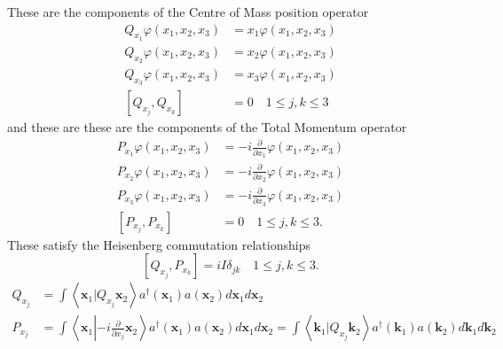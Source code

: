 \documentclass[aps,preprint]{revtex4}%
\begin{document}
These are the components of the Centre of Mass position operator%
\begin{align}
Q_{x_{1}}\varphi\left(  x_{1},x_{2},x_{3}\right)   &  =x_{1}\varphi\left(
x_{1},x_{2},x_{3}\right) \\
Q_{x_{2}}\varphi\left(  x_{1},x_{2},x_{3}\right)   &  =x_{2}\varphi\left(
x_{1},x_{2},x_{3}\right) \\
Q_{x_{3}}\varphi\left(  x_{1},x_{2},x_{3}\right)   &  =x_{3}\varphi\left(
x_{1},x_{2},x_{3}\right) \\
\left[  Q_{x_{j}},Q_{x_{k}}\right]   &  =0\quad1\leq j,k\leq3
\end{align}
and these are these are the components of the Total Momentum operator%
\begin{align}
P_{x_{1}}\varphi\left(  x_{1},x_{2},x_{3}\right)   &  =-i\frac{\partial
}{\partial x_{1}}\varphi\left(  x_{1},x_{2},x_{3}\right) \\
P_{x_{2}}\varphi\left(  x_{1},x_{2},x_{3}\right)   &  =-i\frac{\partial
}{\partial x_{2}}\varphi\left(  x_{1},x_{2},x_{3}\right) \\
P_{x_{3}}\varphi\left(  x_{1},x_{2},x_{3}\right)   &  =-i\frac{\partial
}{\partial x_{3}}\varphi\left(  x_{1},x_{2},x_{3}\right) \\
\left[  P_{x_{j}},P_{x_{k}}\right]   &  =0\quad1\leq j,k\leq3.
\end{align}
These satisfy the Heisenberg commutation relationships
\begin{equation}
\left[  Q_{x_{j}},P_{x_{k}}\right]  =iI\delta_{jk}\quad1\leq j,k\leq3.
\end{equation}%
\begin{align}
Q_{x_{j}}  &  =\int\left\langle \left.  \mathbf{x}_{1}\right\vert Q_{x_{j}%
}\mathbf{x}_{2}\right\rangle a^{\dagger}\left(  \mathbf{x}_{1}\right)
a\left(  \mathbf{x}_{2}\right)  d\mathbf{x}_{1}d\mathbf{x}_{2}\\
P_{x_{j}}  &  =\int\left\langle \mathbf{x}_{1}\left\vert -i\frac{\partial
}{\partial x_{j}}\mathbf{x}_{2}\right.  \right\rangle a^{\dagger}\left(
\mathbf{x}_{1}\right)  a\left(  \mathbf{x}_{2}\right)  d\mathbf{x}%
_{1}d\mathbf{x}_{2}=\int\left\langle \left.  \mathbf{k}_{1}\right\vert
Q_{x_{j}}\mathbf{k}_{2}\right\rangle a^{\dagger}\left(  \mathbf{k}_{1}\right)
a\left(  \mathbf{k}_{2}\right)  d\mathbf{k}_{1}d\mathbf{k}_{2}%
\end{align}%
\end{document}
